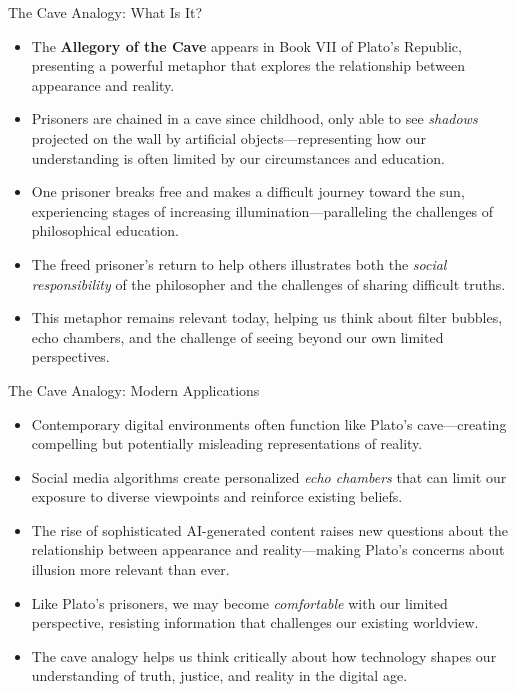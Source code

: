 \documentclass[aspectratio=169]{beamer}
\begin{document}
\begin{frame}{The Cave Analogy: What Is It?}
\begin{itemize}
\item The \textbf{Allegory of the Cave} appears in Book VII of Plato's Republic, presenting a powerful metaphor that explores the relationship between appearance and reality.
\item Prisoners are chained in a cave since childhood, only able to see \emph{shadows} projected on the wall by artificial objects—representing how our understanding is often limited by our circumstances and education.
\item One prisoner breaks free and makes a difficult journey toward the sun, experiencing stages of increasing illumination—paralleling the challenges of philosophical education.
\item The freed prisoner's return to help others illustrates both the \emph{social responsibility} of the philosopher and the challenges of sharing difficult truths.
\item This metaphor remains relevant today, helping us think about filter bubbles, echo chambers, and the challenge of seeing beyond our own limited perspectives.
\end{itemize}
\end{frame}

\begin{frame}{The Cave Analogy: Modern Applications}
\begin{itemize}
\item Contemporary digital environments often function like Plato's cave—creating compelling but potentially misleading representations of reality.
\item Social media algorithms create personalized \emph{echo chambers} that can limit our exposure to diverse viewpoints and reinforce existing beliefs.
\item The rise of sophisticated AI-generated content raises new questions about the relationship between appearance and reality—making Plato's concerns about illusion more relevant than ever.
\item Like Plato's prisoners, we may become \emph{comfortable} with our limited perspective, resisting information that challenges our existing worldview.
\item The cave analogy helps us think critically about how technology shapes our understanding of truth, justice, and reality in the digital age.
\end{itemize}
\end{frame}
\end{document}
